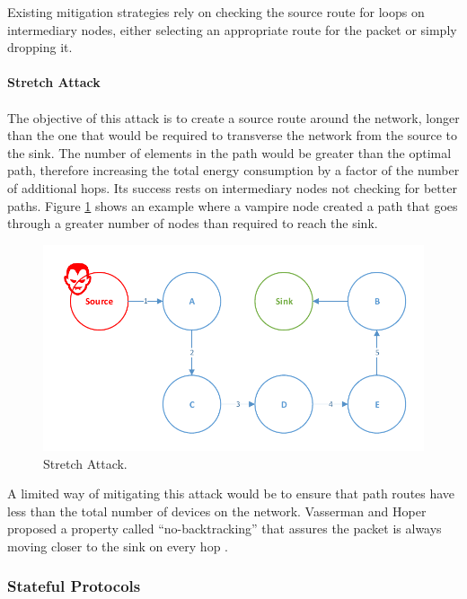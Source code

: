 Existing mitigation strategies rely on checking the source route for loops on intermediary nodes, either selecting an appropriate route for the packet or simply dropping it.

\paragraph{\textbf{Stretch Attack}}
\paragraph{}
The objective of this attack is to create a source route around the network, longer than the one that would be required to transverse the network from the source to the sink. The number of elements in the path would be greater than the optimal path, therefore increasing the total energy consumption by a factor of the number of additional hops. Its success rests on intermediary nodes not checking for better paths. Figure \ref{fig:stretch_attack} shows an example where a vampire node created a path that goes through a greater number of nodes than required to reach the sink.

\begin{figure}[h]
  \centering
  \includegraphics[width=0.8\linewidth]{figures/Stretch_Attack.pdf}
  \caption{Stretch Attack.}
  \label{fig:stretch_attack}
\end{figure}

A limited way of mitigating this attack would be to ensure that path routes have less than the total number of devices on the network. Vasserman and Hoper proposed a property called ``no-backtracking'' that assures the packet is always moving closer to the sink on every hop \cite{Vasserman2013}.
\pagebreak
\subsubsection{Stateful Protocols}
\label{sec:tables_routing}
